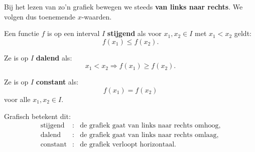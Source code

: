 \documentclass{ximera}
\begin{document}
Bij het lezen van zo'n grafiek bewegen we steeds \textbf{van links naar rechts}.
We volgen dus toenemende \(x\)-waarden.


\begin{definitie}
Een functie \(f\) is op een interval \(I\) \textbf{stijgend} als voor
\(x_1,x_2\in I\) met \(x_1<x_2\) geldt:
\[
f(x_1)\leq f(x_2).
\]

Ze is op \(I\) \textbf{dalend} als:
\[
x_1<x_2 \Longrightarrow f(x_1)\geq f(x_2).
\]

Ze is op \(I\) \textbf{constant} als:
\[
f(x_1)=f(x_2)
\]
voor alle \(x_1,x_2\in I\).
\end{definitie}

Grafisch betekent dit:
\[
\begin{array}{ccl}
\text{stijgend} &:& \text{de grafiek gaat van links naar rechts omhoog},\\
\text{dalend}   &:& \text{de grafiek gaat van links naar rechts omlaag},\\
\text{constant} &:& \text{de grafiek verloopt horizontaal}.
\end{array}
\]
\end{document}
